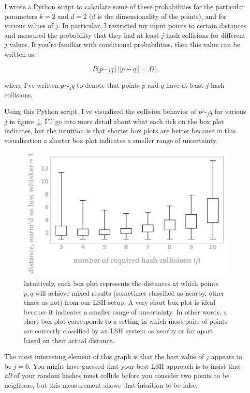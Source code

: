 \documentclass[20pt,]{extarticle}
\begin{document}
I wrote a Python script to calculate some of these probabilities for the
particular parameters \(k=2\) and \(d=2\) (\(d\) is the dimensionality
of the points), and for various values of \(j\). In particular, I
restricted my input points to certain distances and measured the
probability that they had at least \(j\) hash collisions for different
\(j\) values. If you're familiar with conditional probabilities, then
this value can be written as:

\[ P\big(p \sim_j q \, \big| \, ||p-q|| = D\big), \]

where I've written \(p\sim_j q\) to denote that points \(p\) and \(q\)
have at least \(j\) hash collisions.

Using this Python script, I've visualized the collision behavior of
\(p\sim_j q\) for various \(j\) in figure~\ref{fig:fig9}. I'll go into
more detail about what each tick on the box plot indicates, but the
intuition is that shorter box plots are better because in this
visualization a shorter box plot indicates a smaller range of
uncertainty.

\begin{figure}
\centering
\includegraphics{images/image9@2x.png}
\caption{Intuitively, each box plot represents the distances at which
points \(p, q\) will achieve mixed results (sometimes classified as
nearby, other times as not) from our LSH setup. A very short box plot is
ideal because it indicates a smaller range of uncertainty. In other
words, a short box plot corresponds to a setting in which most pairs of
points are correctly classified by an LSH system as nearby or far apart
based on their actual distance.}\label{fig:fig9}
\end{figure}

The most interesting element of this graph is that the best value of
\(j\) appears to be \(j=6.\) You might have guessed that your best LSH
approach is to insist that \emph{all} of your random hashes must collide
before you consider two points to be neighbors, but this measurement
shows that intuition to be false.
\end{document}
